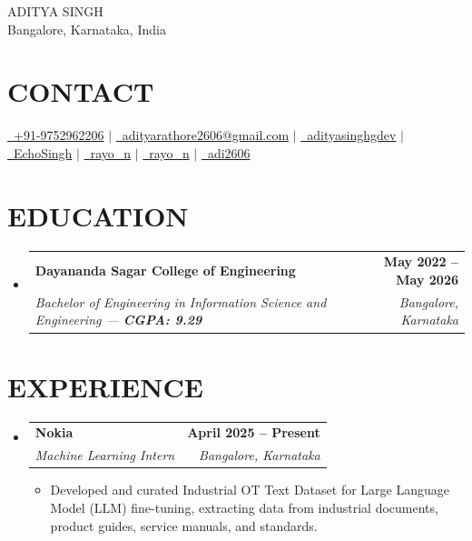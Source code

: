 \documentclass[letterpaper,10pt]{article}
\makeatletter
\newcommand{\resumeSubHeadingListStart}{\begin{itemize}[leftmargin=0.15in,label={}]}
\newcommand{\resumeSubHeadingListEnd}{\end{itemize}}
\newcommand{\resumeSubheading}[4]{%
  \item
  \begin{tabular*}{1.0\textwidth}[t]{l@{\extracolsep{\fill}}r}
    \textbf{#1} & {\small\bfseries #2} \\
    \textit{\color{primary} #3} & {\textit{\color{primary} #4}} \\
  \end{tabular*}\vspace{-2pt}
}
\newcommand{\resumeItemListStart}{\begin{itemize}[leftmargin=12pt]}
\newcommand{\resumeItemListEnd}{\end{itemize}}
\newcommand{\resumeItem}[1]{\item\small{#1}}
\makeatother
\begin{document}
\begin{center}
    {\Huge \scshape ADITYA SINGH} \\[6pt]
    \large Bangalore, Karnataka, India \\[8pt]
\end{center}

\section{CONTACT}
\begin{center}
\small
\href{tel:+919752962206}{\raisebox{-0.1\height}{\faPhone}\ +91-9752962206} $|$ 
\href{mailto:adityarathore2606@gmail.com}{\raisebox{-0.1\height}{\faEnvelope}\ adityarathore2606@gmail.com} $|$
\href{https://linkedin.com/in/adityasinghgdev}{\raisebox{-0.1\height}{\faLinkedin}\ adityasinghgdev} $|$
\href{https://github.com/EchoSingh}{\raisebox{-0.1\height}{\faGithub}\ EchoSingh} $|$
\href{https://www.leetcode.com/rayo_n}{\ rayo\_n} $|$
\href{https://github.com/EchoSingh}{\raisebox{-0.1\height}{\faHackerrank}\ rayo\_n} $|$
\href{https://github.com/EchoSingh}{\raisebox{-0.1\height}{\faKaggle}\ adi2606}
\end{center}

\section{EDUCATION}
\vspace{5 pt}
  \resumeSubHeadingListStart
    \resumeSubheading
      {Dayananda Sagar College of Engineering}{May 2022 -- May 2026}
      {Bachelor of Engineering in Information Science and Engineering --- \textbf{CGPA: 9.29}}{Bangalore, Karnataka}
  \resumeSubHeadingListEnd

\section{EXPERIENCE}
\vspace{5 pt}
  \resumeSubHeadingListStart
    \resumeSubheading
      {Nokia}{April 2025 -- Present}
      {Machine Learning Intern}{Bangalore, Karnataka}
      \resumeItemListStart
        \resumeItem{Developed and curated Industrial OT Text Dataset for Large Language Model (LLM) fine-tuning, extracting data from industrial documents, product guides, service manuals, and standards.}
      \resumeItemListEnd
  \resumeSubHeadingListEnd
\end{document}
